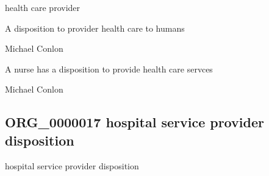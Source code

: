 \documentclass[letterpaper,10pt,english]{sphinxmanual}
\begin{document}
\begin{sphinxShadowBox}

\sphinxAtStartPar
health care provider
\end{sphinxShadowBox}

\begin{sphinxShadowBox}

\sphinxAtStartPar
A disposition to provider health care to humans
\end{sphinxShadowBox}

\begin{sphinxShadowBox}

\sphinxAtStartPar
Michael Conlon 
\end{sphinxShadowBox}

\begin{sphinxShadowBox}

\sphinxAtStartPar
A nurse has a disposition to provide health care servces
\end{sphinxShadowBox}

\begin{sphinxShadowBox}

\sphinxAtStartPar
Michael Conlon 
\end{sphinxShadowBox}
\begin{quote}

\ignorespaces \end{quote}


\subsection{ORG\_0000017 \sphinxhyphen{} hospital service provider disposition}
\label{\detokenize{doc-ORG_0000017:org-0000017-hospital-service-provider-disposition}}\label{\detokenize{doc-ORG_0000017:index-0}}\label{\detokenize{doc-ORG_0000017::doc}}
\begin{sphinxShadowBox}

\sphinxAtStartPar
hospital service provider disposition
\end{sphinxShadowBox}
\end{document}
